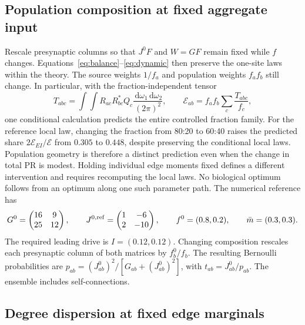 \documentclass[11pt]{article}
\newcommand{\dd}{\,\mathrm d}
\newcommand{\energy}{\mathcal E}
\begin{document}
\subsection{Population composition at fixed aggregate input}

Rescale presynaptic columns so that $J^0F$ and $W=GF$ remain fixed while $f$
changes. Equations~\eqref{eq:balance}--\eqref{eq:dynamic} then preserve the
one-site laws within the theory. The source weights $1/f_a$ and population
weights $f_af_b$ still change. In particular, with the fraction-independent
tensor
\begin{equation}
 T_{abc}=\int\!\!\int R_{ac}R_{bc}^*Q_c
                    \frac{\dd\omega_1\dd\omega_2}{(2\pi)^2},
 \qquad
 \energy_{ab}=f_af_b\sum_c\frac{T_{abc}}{f_c},
 \label{eq:composition}
\end{equation}
one conditional calculation predicts the entire controlled fraction family.
For the reference local law, changing the fraction from 80:20 to 60:40
raises the predicted share $2\energy_{EI}/\energy$ from $0.305$ to $0.448$,
despite preserving the conditional local laws. Population geometry is
therefore a distinct prediction even when the change in total PR is modest.
Holding individual edge moments fixed defines a different intervention and
requires recomputing the local laws. No biological optimum follows from
an optimum along one such parameter path.
The numerical reference has
\begin{equation}
 G^0=\begin{pmatrix}16&9\\25&12\end{pmatrix},\qquad
 J^{0,\rm ref}=\begin{pmatrix}1&-6\\2&-10\end{pmatrix},\qquad
 f^0=(0.8,0.2),\qquad \bar m=(0.3,0.3).
 \label{eq:reference}
\end{equation}
The required leading drive is $I=(0.12,0.12)$. Changing composition rescales
each presynaptic column of both matrices by $f_b^0/f_b$. The resulting
Bernoulli probabilities are $p_{ab}=(J^0_{ab})^2/[G_{ab}+(J^0_{ab})^2]$,
with $t_{ab}=J^0_{ab}/p_{ab}$. The ensemble includes self-connections.

\subsection{Degree dispersion at fixed edge marginals}
\end{document}
